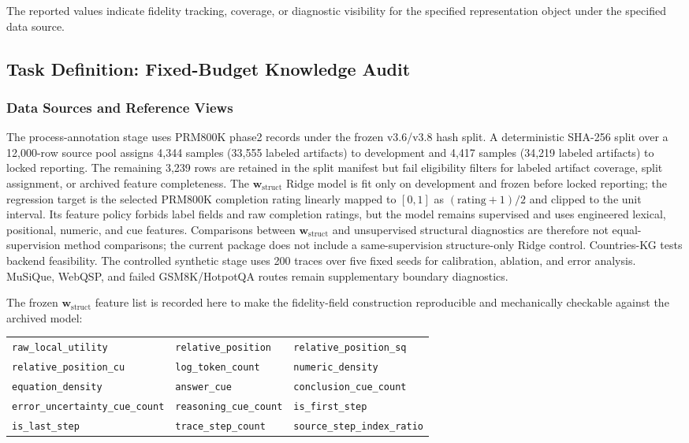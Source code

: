 \documentclass[a4paper,fleqn]{cas-sc}
\newcommand{\wstruct}{\ensuremath{\mathbf{w}_{\mathrm{struct}}}}
\begin{document}
The reported values indicate fidelity tracking, coverage, or diagnostic visibility for the specified representation object under the specified data source.

\subsection{Task Definition: Fixed-Budget Knowledge Audit}
\label{sec:application-setup}

\subsubsection{Data Sources and Reference Views}

The process-annotation stage uses PRM800K phase2 records under the frozen v3.6/v3.8 hash split. A deterministic SHA-256 split over a 12,000-row source pool assigns 4,344 samples (33,555 labeled artifacts) to development and 4,417 samples (34,219 labeled artifacts) to locked reporting. The remaining 3,239 rows are retained in the split manifest but fail eligibility filters for labeled artifact coverage, split assignment, or archived feature completeness. The \wstruct{} Ridge model is fit only on development and frozen before locked reporting; the regression target is the selected PRM800K completion rating linearly mapped to $[0,1]$ as $(\mathrm{rating}+1)/2$ and clipped to the unit interval. Its feature policy forbids label fields and raw completion ratings, but the model remains supervised and uses engineered lexical, positional, numeric, and cue features. Comparisons between \wstruct{} and unsupervised structural diagnostics are therefore not equal-supervision method comparisons; the current package does not include a same-supervision structure-only Ridge control. Countries-KG tests backend feasibility. The controlled synthetic stage uses 200 traces over five fixed seeds for calibration, ablation, and error analysis. MuSiQue, WebQSP, and failed GSM8K/HotpotQA routes remain supplementary boundary diagnostics.

The frozen \wstruct{} feature list is recorded here to make the fidelity-field construction reproducible and mechanically checkable against the archived model:
\begin{center}
\scriptsize
\begin{tabular}{lll}
\texttt{raw\_local\_utility} & \texttt{relative\_position} & \texttt{relative\_position\_sq} \\
\texttt{relative\_position\_cu} & \texttt{log\_token\_count} & \texttt{numeric\_density} \\
\texttt{equation\_density} & \texttt{answer\_cue} & \texttt{conclusion\_cue\_count} \\
\texttt{error\_uncertainty\_cue\_count} & \texttt{reasoning\_cue\_count} & \texttt{is\_first\_step} \\
\texttt{is\_last\_step} & \texttt{trace\_step\_count} & \texttt{source\_step\_index\_ratio}
\end{tabular}
\end{center}
\end{document}
